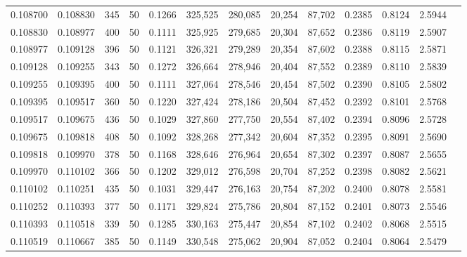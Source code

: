 \begin{tabular}{rrrrrrrrrrrrr}
0.108700 & 0.108830 &   345 &  50 &                                     0.1266 & 325,525 & 280,085 &  20,254 &  87,702 & 0.2385 & 0.8124 & 2.5944 \\
0.108830 & 0.108977 &   400 &  50 &                                     0.1111 & 325,925 & 279,685 &  20,304 &  87,652 & 0.2386 & 0.8119 & 2.5907 \\
0.108977 & 0.109128 &   396 &  50 &                                     0.1121 & 326,321 & 279,289 &  20,354 &  87,602 & 0.2388 & 0.8115 & 2.5871 \\
0.109128 & 0.109255 &   343 &  50 &                                     0.1272 & 326,664 & 278,946 &  20,404 &  87,552 & 0.2389 & 0.8110 & 2.5839 \\
0.109255 & 0.109395 &   400 &  50 &                                     0.1111 & 327,064 & 278,546 &  20,454 &  87,502 & 0.2390 & 0.8105 & 2.5802 \\
0.109395 & 0.109517 &   360 &  50 &                                     0.1220 & 327,424 & 278,186 &  20,504 &  87,452 & 0.2392 & 0.8101 & 2.5768 \\
0.109517 & 0.109675 &   436 &  50 &                                     0.1029 & 327,860 & 277,750 &  20,554 &  87,402 & 0.2394 & 0.8096 & 2.5728 \\
0.109675 & 0.109818 &   408 &  50 &                                     0.1092 & 328,268 & 277,342 &  20,604 &  87,352 & 0.2395 & 0.8091 & 2.5690 \\
0.109818 & 0.109970 &   378 &  50 &                                     0.1168 & 328,646 & 276,964 &  20,654 &  87,302 & 0.2397 & 0.8087 & 2.5655 \\
0.109970 & 0.110102 &   366 &  50 &                                     0.1202 & 329,012 & 276,598 &  20,704 &  87,252 & 0.2398 & 0.8082 & 2.5621 \\
0.110102 & 0.110251 &   435 &  50 &                                     0.1031 & 329,447 & 276,163 &  20,754 &  87,202 & 0.2400 & 0.8078 & 2.5581 \\
0.110252 & 0.110393 &   377 &  50 &                                     0.1171 & 329,824 & 275,786 &  20,804 &  87,152 & 0.2401 & 0.8073 & 2.5546 \\
0.110393 & 0.110518 &   339 &  50 &                                     0.1285 & 330,163 & 275,447 &  20,854 &  87,102 & 0.2402 & 0.8068 & 2.5515 \\
0.110519 & 0.110667 &   385 &  50 &                                     0.1149 & 330,548 & 275,062 &  20,904 &  87,052 & 0.2404 & 0.8064 & 2.5479 \\

\end{tabular}
